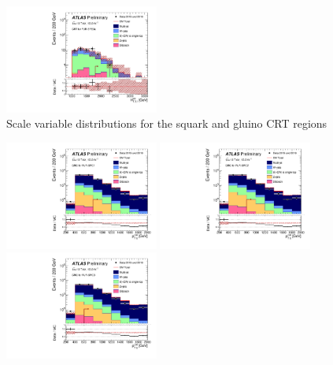 \begin{figure}[tbp]
\begin{center}
\includegraphics[width=0.45\textwidth]{figures/ATLAS-CONF-2016-078_INT/N-1Plots/AtlasStyle/Preliminary/CRT_SRJigsawSRS3a_LastCut_CRT_minusone}
\end{center}
\caption{Scale variable distributions for the squark and gluino CRT regions}
\label{fig:CRT_SRJigsawSRG1a_LastCut_CRT_minusone}
\end{figure}

\begin{figure}[tbp]
\begin{center}
\includegraphics[width=0.45\textwidth]{figures/ATLAS-CONF-2016-078_INT/N-1Plots/AtlasStyle/Preliminary/CRQ_SRJigsawSRC1_LastCut_CRQ_minusone}
\includegraphics[width=0.45\textwidth]{figures/ATLAS-CONF-2016-078_INT/N-1Plots/AtlasStyle/Preliminary/CRQ_SRJigsawSRC2_LastCut_CRQ_minusone}
\includegraphics[width=0.45\textwidth]{figures/ATLAS-CONF-2016-078_INT/N-1Plots/AtlasStyle/Preliminary/CRQ_SRJigsawSRC3_LastCut_CRQ_minusone}

\end{center}
\end{figure}
